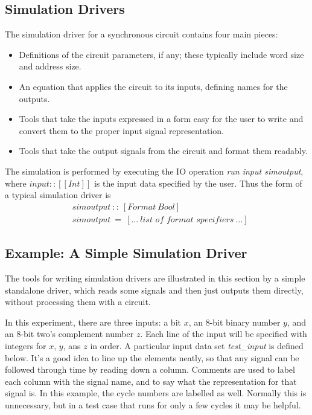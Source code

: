 \documentclass[a4paper,openany,fleqn]{book}
\begin{document}
\subsection{Simulation Drivers}
\label{sec:simulation-drivers}


The simulation driver for a synchronous circuit contains four main
pieces:

\begin{itemize}
\item Definitions of the circuit parameters, if any; these typically
  include word size and address size.
\item An equation that applies the circuit to its inputs, defining
  names for the outputs.
\item Tools that take the inputs expressed in a form easy for the user
  to write and convert them to the proper input signal representation.
\item Tools that take the output signals from the circuit and format
  them readably.
\end{itemize}

The simulation is performed by executing the IO operation \textit{run
  input simoutput}, where $\textit{input} :: [[\textit{Int}]]$ is the
input data specified by the user.  Thus the form of a typical simulation
  driver is
\begin{align*}
  & \mathit{simoutput}\ ::\ [\mathit{Format}\ \mathit{Bool}] \\
  & \mathit{simoutput}\ =\ [\ldots\ \textit{list of format specifiers}\ \ldots]
\end{align*}

\subsection{Example: A Simple Simulation Driver}
\label{sec:example-sim-driver}

The tools for writing simulation drivers are illustrated in this
section by a simple standalone driver, which reads some signals and
then just outputs them directly, without processing them with a circuit.

In this experiment, there are three inputs: a bit $x$, an 8-bit binary
number $y$, and an 8-bit two's complement number $z$.  Each line of
the input will be specified with integers for $x$, $y$, ans $z$ in
order.  A particular input data set \textit{test\_input} is defined
below.  It's a good idea to line up the elements neatly, so that any
signal can be followed through time by reading down a column.
Comments are used to label each column with the signal name, and to
say what the representation for that signal is.  In this example, the
cycle numbers are labelled as well.  Normally this is unnecessary, but
in a test case that runs for only a few cycles it may be helpful.
\end{document}
